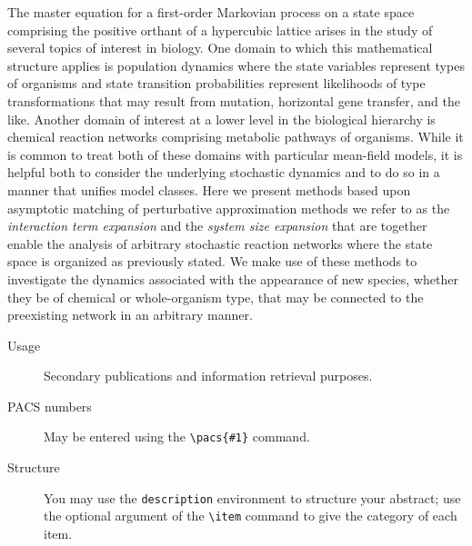 The master equation for a first-order Markovian process on a state space comprising the positive orthant of a hypercubic lattice arises in the study of several topics of interest in biology. One domain to which this mathematical structure applies is population dynamics where the state variables represent types of organisms and state transition probabilities represent likelihoods of type transformations that may result from mutation, horizontal gene transfer, and the like. Another domain of interest at a lower level in the biological hierarchy is chemical reaction networks comprising metabolic pathways of organisms. While it is common to treat both of these domains with particular mean-field models, it is helpful both to consider the underlying stochastic dynamics and to do so in a manner that unifies model classes. Here we present methods based upon asymptotic matching of perturbative approximation methods we refer to as the \emph{interaction term expansion} and the \emph{system size expansion} that are together enable the analysis of arbitrary stochastic reaction networks where the state space is organized as previously stated. We make use of these methods to investigate the dynamics associated with the appearance of new species, whether they be of chemical or whole-organism type, that may be connected to the preexisting network in an arbitrary manner.
\begin{description}
\item[Usage]
Secondary publications and information retrieval purposes.
\item[PACS numbers]
May be entered using the \verb+\pacs{#1}+ command.
\item[Structure]
You may use the \texttt{description} environment to structure your abstract;
use the optional argument of the \verb+\item+ command to give the category of each item.
\end{description}